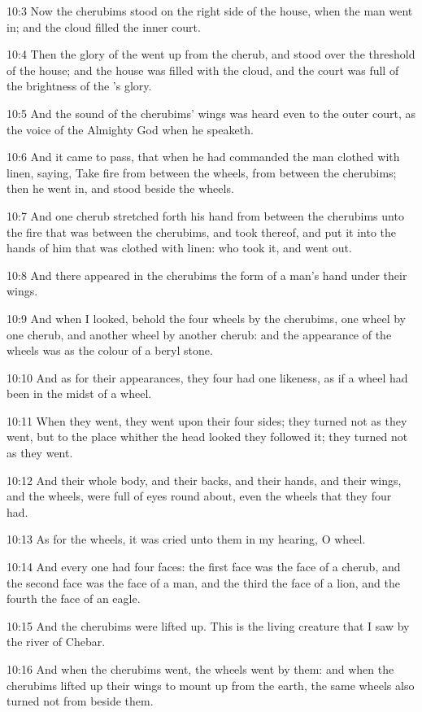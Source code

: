 10:3 Now the cherubims stood on the right side of the house, when the
man went in; and the cloud filled the inner court.

10:4 Then the glory of the \LORD went up from the cherub, and stood
over the threshold of the house; and the house was filled with the
cloud, and the court was full of the brightness of the \LORD's glory.

10:5 And the sound of the cherubims' wings was heard even to the outer
court, as the voice of the Almighty God when he speaketh.

10:6 And it came to pass, that when he had commanded the man clothed
with linen, saying, Take fire from between the wheels, from between
the cherubims; then he went in, and stood beside the wheels.

10:7 And one cherub stretched forth his hand from between the
cherubims unto the fire that was between the cherubims, and took
thereof, and put it into the hands of him that was clothed with linen:
who took it, and went out.

10:8 And there appeared in the cherubims the form of a man's hand
under their wings.

10:9 And when I looked, behold the four wheels by the cherubims, one
wheel by one cherub, and another wheel by another cherub: and the
appearance of the wheels was as the colour of a beryl stone.

10:10 And as for their appearances, they four had one likeness, as if
a wheel had been in the midst of a wheel.

10:11 When they went, they went upon their four sides; they turned not
as they went, but to the place whither the head looked they followed
it; they turned not as they went.

10:12 And their whole body, and their backs, and their hands, and
their wings, and the wheels, were full of eyes round about, even the
wheels that they four had.

10:13 As for the wheels, it was cried unto them in my hearing, O
wheel.

10:14 And every one had four faces: the first face was the face of a
cherub, and the second face was the face of a man, and the third the
face of a lion, and the fourth the face of an eagle.

10:15 And the cherubims were lifted up. This is the living creature
that I saw by the river of Chebar.

10:16 And when the cherubims went, the wheels went by them: and when
the cherubims lifted up their wings to mount up from the earth, the
same wheels also turned not from beside them.

